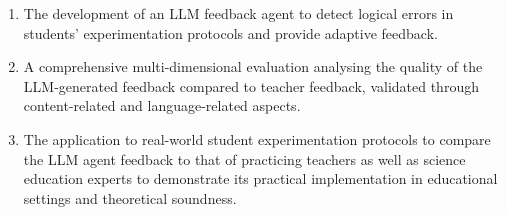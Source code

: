 \begin{enumerate} 
\item The development of an LLM feedback agent to detect logical errors in students' experimentation protocols and provide adaptive feedback.

\item A comprehensive multi-dimensional evaluation analysing the quality of the LLM-generated feedback compared to teacher feedback, validated through content-related and language-related aspects.

\item The application to real-world student experimentation protocols to compare the LLM agent feedback to that of practicing teachers as well as science education experts to demonstrate its practical implementation in educational settings and theoretical soundness.

\end{enumerate}

